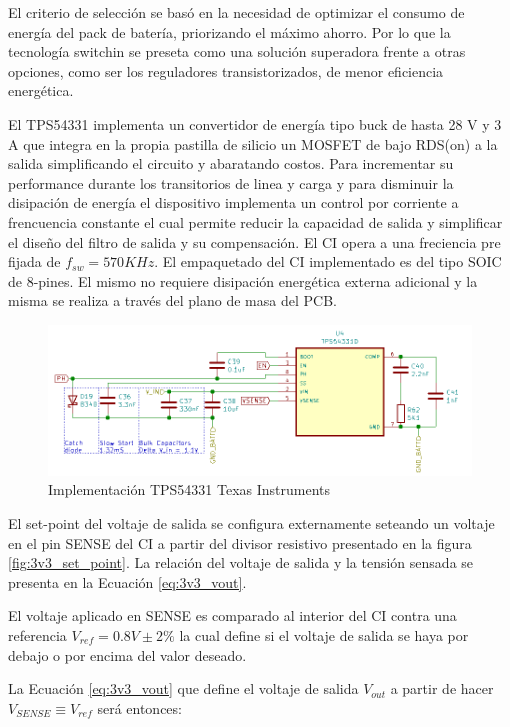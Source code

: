 \documentclass[10pt, a4paper]{article}
\begin{document}
El criterio de selección se basó en la necesidad de optimizar el consumo de
energía del pack de batería, priorizando el máximo ahorro. Por lo que la
tecnología switchin se preseta como una solución superadora frente a otras
opciones, como ser los reguladores transistorizados, de menor eficiencia
energética.

El TPS54331 implementa un convertidor de energía tipo buck de hasta 28 V y 3 A
que integra en la propia pastilla de silicio un MOSFET de bajo RDS(on) a la
salida simplificando el circuito y abaratando costos.
Para incrementar su performance durante los transitorios de linea y carga y para
disminuir la disipación de energía el dispositivo implementa un control por
corriente a frencuencia constante el cual permite reducir la capacidad de salida
y simplificar el diseño del filtro de salida y su compensación. El \acrshort{CI}
opera a una freciencia pre fijada de $f_{sw}=570 KHz$.
El empaquetado del \acrshort{CI} implementado es del tipo SOIC de 8-pines. El
mismo no requiere disipación energética externa adicional y la misma se realiza
a través del plano de masa del \acrshort{PCB}.

\begin{figure}[h!]
    \centering
    \includegraphics[width=0.8\linewidth]{hardware/3v3/3v3_IC.png}
        \caption{Implementación TPS54331 Texas Instruments}
        \label{fig:3v3_IC}
\end{figure}
\FloatBarrier

El set-point del voltaje de salida se configura externamente seteando un voltaje
en el pin SENSE del \acrshort{CI} a partir del divisor resistivo presentado en
la figura \ref{fig:3v3_set_point}. La relación del voltaje de salida y la
tensión sensada se presenta en la Ecuación \ref{eq:3v3_vout}.

El voltaje aplicado en SENSE es comparado al interior del \acrshort{CI} contra
una referencia $V_{ref} = 0.8 V \pm2\%$ la cual define si el voltaje de
salida se haya por debajo o por encima del valor deseado. 

La Ecuación \ref{eq:3v3_vout} que define el voltaje de salida $V_{out}$ a partir
de hacer $ V_{SENSE} \equiv V_{ref}$ será entonces:
\end{document}
